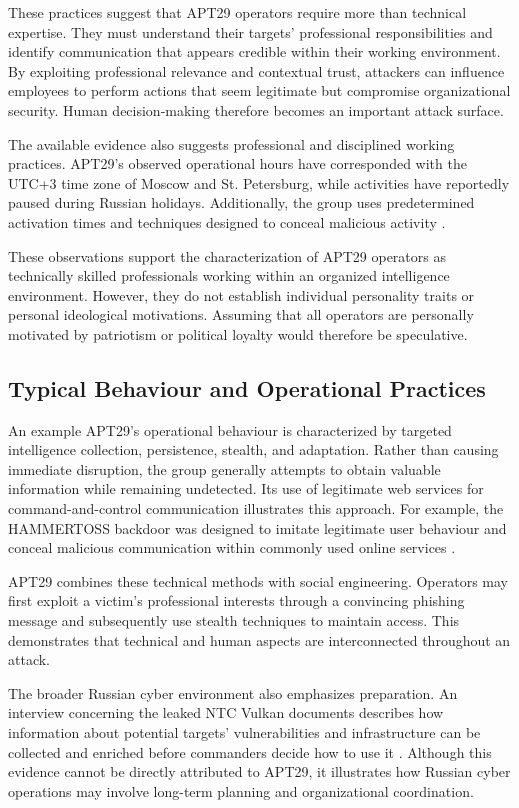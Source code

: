 These practices suggest that APT29 operators require more than technical expertise. They must understand their targets’ professional responsibilities and identify communication that appears credible within their working environment. By exploiting professional relevance and contextual trust, attackers can influence employees to perform actions that seem legitimate but compromise organizational security. Human decision-making therefore becomes an important attack surface. 

The available evidence also suggests professional and disciplined working practices. APT29’s observed operational hours have corresponded with the UTC+3 time zone of Moscow and St. Petersburg, while activities have reportedly paused during Russian holidays. Additionally, the group uses predetermined activation times and techniques designed to conceal malicious activity \parencite[70]{geers2015cyber}. 

These observations support the characterization of APT29 operators as technically skilled professionals working within an organized intelligence environment. However, they do not establish individual personality traits or personal ideological motivations. Assuming that all operators are personally motivated by patriotism or political loyalty would therefore be speculative. 

\subsection{Typical Behaviour and Operational Practices}

An example APT29’s operational behaviour is characterized by targeted intelligence collection, persistence, stealth, and adaptation. Rather than causing immediate disruption, the group generally attempts to obtain valuable information while remaining undetected. Its use of legitimate web services for command-and-control communication illustrates this approach. For example, the HAMMERTOSS backdoor was designed to imitate legitimate user behaviour and conceal malicious communication within commonly used online services \parencite[69-70]{geers2015cyber}. 

APT29 combines these technical methods with social engineering. Operators may first exploit a victim’s professional interests through a convincing phishing message and subsequently use stealth techniques to maintain access. This demonstrates that technical and human aspects are interconnected throughout an attack. 

The broader Russian cyber environment also emphasizes preparation. An interview concerning the leaked NTC Vulkan documents describes how information about potential targets’ vulnerabilities and infrastructure can be collected and enriched before commanders decide how to use it \parencite[1:52–2:40]{DWNews}. Although this evidence cannot be directly attributed to APT29, it illustrates how Russian cyber operations may involve long-term planning and organizational coordination. 

